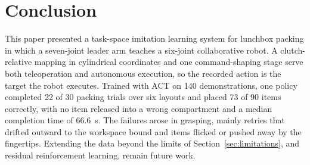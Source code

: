 \section{Conclusion}
\label{sec:conclusion}
This paper presented a task-space imitation learning system for lunchbox
packing in which a seven-joint leader arm teaches a six-joint collaborative
robot. A clutch-relative mapping in cylindrical coordinates and one
command-shaping stage serve
both teleoperation and autonomous execution, so the recorded action is the
target the robot executes. Trained with ACT on 140 demonstrations, one policy
completed 22 of 30 packing trials over six layouts and placed 73 of 90 items
correctly, with no item released into a wrong compartment and a median
completion time of 66.6~s. The failures arose in grasping, mainly retries
that drifted outward to the workspace bound and items flicked or pushed away
by the fingertips. Extending the data beyond the limits of
Section~\ref{sec:limitations}, and residual reinforcement learning, remain
future work.
